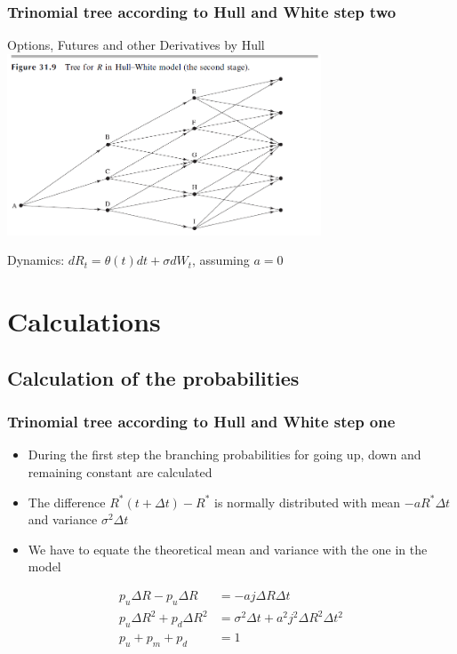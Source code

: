 \documentclass{beamer}
\begin{document}
\begin{frame}
\frametitle{Trinomial tree according to Hull and White step two}
\begin{block}{Options, Futures and other Derivatives by Hull}
\includegraphics[width=0.7\textwidth]{Trinomialbaum hull White step two}
\end{block}
Dynamics: $dR_t = \theta(t)dt + \sigma dW_t$, assuming $a=0$

\end{frame}



\section{Calculations}

\subsection{Calculation of the probabilities}
\begin{frame}
\frametitle{Trinomial tree according to Hull and White step one} 
\begin{itemize}
\item During the first step the branching probabilities for going up, down and remaining constant are calculated
\item The difference $R^*(t+\Delta t) - R^*$ is normally distributed with mean $-aR^* \Delta t$ and variance $\sigma ^2 \Delta t$ 
\item We have to equate the theoretical mean and variance with the one in the model
\end{itemize}

\begin{align*}
p_u \Delta R-p_u \Delta R &= -aj\Delta R\Delta t\\
p_u\Delta R^2 + p_d \Delta R^2 &= \sigma ^2 \Delta t + a^2j^2 \Delta R^2 \Delta t^2\\
p_u + p_m + p_d &= 1
\end{align*}


\end{frame}
\end{document}

